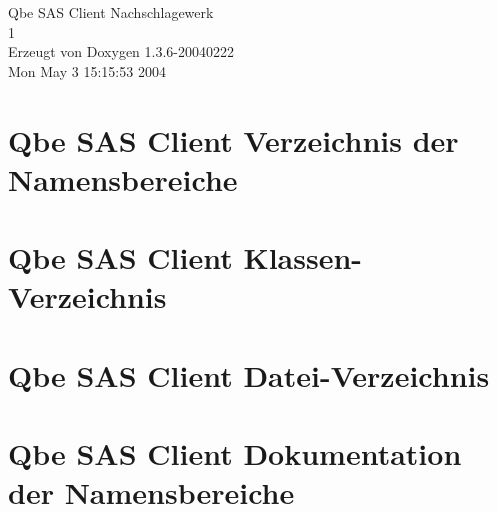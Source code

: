 \documentclass[a4paper]{book}
\begin{document}
\begin{titlepage}
\vspace*{7cm}
\begin{center}
{\Large Qbe SAS Client Nachschlagewerk\\[1ex]\large 1 }\\
\vspace*{1cm}
{\large Erzeugt von Doxygen 1.3.6-20040222}\\
\vspace*{0.5cm}
{\small Mon May 3 15:15:53 2004}\\
\end{center}
\end{titlepage}
\clearemptydoublepage
{}
\tableofcontents
\clearemptydoublepage
{}
\chapter{Qbe SAS Client Verzeichnis der Namensbereiche}

\chapter{Qbe SAS Client Klassen-Verzeichnis}

\chapter{Qbe SAS Client Datei-Verzeichnis}

\chapter{Qbe SAS Client Dokumentation der Namensbereiche}
















\end{document}
